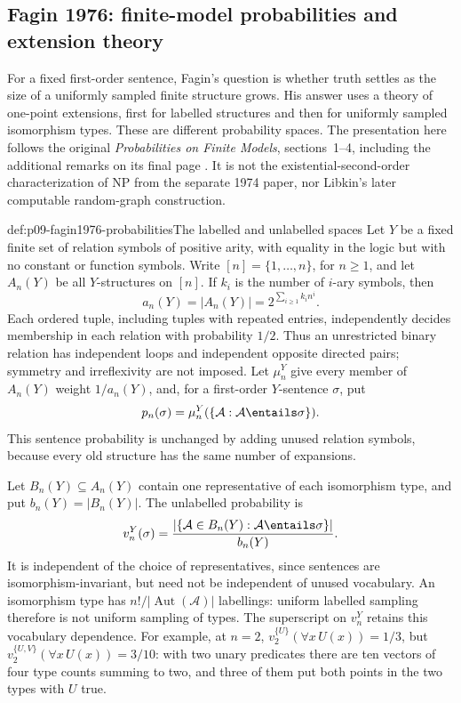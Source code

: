 
\subsection{Fagin 1976: finite-model probabilities and extension theory}
\label{sec:p09-n-c-002-02}

For a fixed first-order sentence, Fagin's question is whether truth settles
as the size of a uniformly sampled finite structure grows.  His answer
uses a theory of one-point extensions, first for labelled structures and
then for uniformly sampled isomorphism types.  These are different
probability spaces.  The presentation here follows the original
\emph{Probabilities on Finite Models}, sections~1--4, including the
additional remarks on its final page \cite[pp.~50--58]{Fagin1976}.
It is not the existential-second-order characterization of NP from the
separate 1974 paper, nor Libkin's later computable random-graph construction.

\begin{hbdefinition}{def:p09-fagin1976-probabilities}{The labelled and unlabelled spaces}
Let \(Y\) be a fixed finite set of relation symbols of positive arity,
with equality in the logic but with no constant or function symbols.
Write \([n]=\{1,\ldots,n\}\), for \(n\geq1\), and let \(A_n(Y)\)
be all \(Y\)-structures on \([n]\).  If \(k_i\) is the number of
\(i\)-ary symbols, then
\[
 a_n(Y)=\lvert A_n(Y)\rvert=2^{\sum_{i\geq1}k_i n^i}.
\]
Each ordered tuple, including tuples with repeated entries, independently
decides membership in each relation with probability \(1/2\).  Thus an
unrestricted binary relation has independent loops and independent
opposite directed pairs; symmetry and irreflexivity are not imposed.
Let \(\mu_n^Y\) give every member of \(A_n(Y)\) weight \(1/a_n(Y)\),
and, for a first-order \(Y\)-sentence \(\sigma\), put
\[
 p_n(\sigma)=\mu_n^Y(\{\mathcal A:\mathcal A\entails\sigma\}).
\]
This sentence probability is unchanged by adding unused relation symbols,
because every old structure has the same number of expansions.

Let \(B_n(Y)\subseteq A_n(Y)\) contain one representative of each
isomorphism type, and put \(b_n(Y)=\lvert B_n(Y)\rvert\).  The
unlabelled probability is
\[
 v_n^Y(\sigma)=
 \frac{\lvert\{\mathcal A\in B_n(Y):\mathcal A\entails\sigma\}\rvert}
      {b_n(Y)}.
\]
It is independent of the choice of representatives, since sentences are
isomorphism-invariant, but need not be independent of unused vocabulary.
An isomorphism type has \(n!/\lvert\operatorname{Aut}(\mathcal A)\rvert\)
labellings: uniform labelled sampling therefore is not uniform sampling of
types.  The superscript on \(v_n^Y\) retains this vocabulary dependence.
For example, at \(n=2\), \(v_2^{\{U\}}(\forall x\,U(x))=1/3\),
but \(v_2^{\{U,V\}}(\forall x\,U(x))=3/10\): with two unary
predicates there are ten vectors of four type counts summing to two,
and three of them put both points in the two types with \(U\) true.
\end{hbdefinition}


